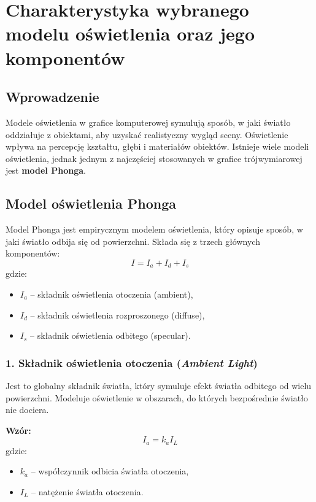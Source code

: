 \section{Charakterystyka wybranego modelu oświetlenia oraz jego komponentów}

\subsection{Wprowadzenie}
Modele oświetlenia w grafice komputerowej symulują sposób, w jaki światło oddziałuje z obiektami, aby uzyskać realistyczny wygląd sceny. Oświetlenie wpływa na percepcję kształtu, głębi i materiałów obiektów. Istnieje wiele modeli oświetlenia, jednak jednym z najczęściej stosowanych w grafice trójwymiarowej jest \textbf{model Phonga}.

\subsection{Model oświetlenia Phonga}
Model Phonga jest empirycznym modelem oświetlenia, który opisuje sposób, w jaki światło odbija się od powierzchni. Składa się z trzech głównych komponentów:
\begin{equation}
I = I_a + I_d + I_s
\end{equation}
gdzie:
\begin{itemize}
    \item \( I_a \) – składnik oświetlenia otoczenia (ambient),
    \item \( I_d \) – składnik oświetlenia rozproszonego (diffuse),
    \item \( I_s \) – składnik oświetlenia odbitego (specular).
\end{itemize}

\subsubsection{1. Składnik oświetlenia otoczenia (\textit{Ambient Light})}
Jest to globalny składnik światła, który symuluje efekt światła odbitego od wielu powierzchni. Modeluje oświetlenie w obszarach, do których bezpośrednie światło nie dociera.

\textbf{Wzór:}
\begin{equation}
I_a = k_a I_L
\end{equation}
gdzie:
\begin{itemize}
    \item \( k_a \) – współczynnik odbicia światła otoczenia,
    \item \( I_L \) – natężenie światła otoczenia.
\end{itemize}

